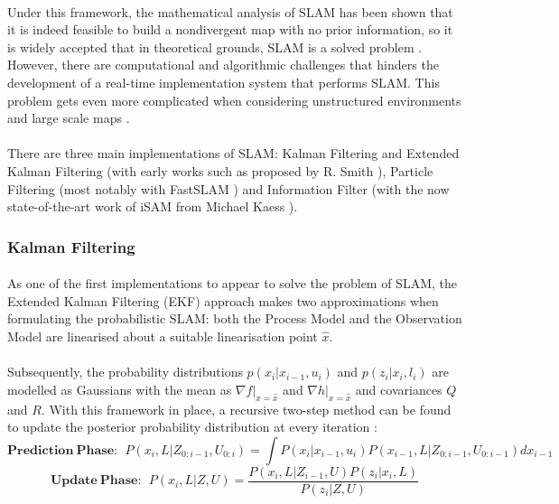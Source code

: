 \documentclass[12pt]{article}
\begin{document}
	\paragraph{}
	Under this framework, the mathematical analysis of SLAM has been shown that it is indeed feasible to build a nondivergent map with no prior information, so it is widely accepted that in theoretical grounds, SLAM is a solved problem \cite{SLAMPartI}\cite{Cadena}\cite{CsorbaThesis}\cite{938381}. However, there are computational and algorithmic challenges that hinders the development of a real-time implementation system that performs SLAM. This problem gets even more complicated when considering unstructured environments and large scale maps \cite{SLAMPartII}.
	
	\paragraph{}
	There are three main implementations of SLAM: Kalman Filtering and Extended Kalman Filtering (with early works such as proposed by R. Smith \cite{Smith:1990:EUS:93002.93291}), Particle Filtering (most notably with FastSLAM \cite{Montemerlo02fastslam:a}) and Information Filter (with the now state-of-the-art work of iSAM from Michael Kaess \cite{Kaess08tro}).

	\subsubsection{Kalman Filtering}
	\paragraph{}
	As one of the first implementations to appear to solve the problem of SLAM, the Extended Kalman Filtering (EKF) approach makes two approximations when formulating the probabilistic SLAM: both the Process Model and the Observation Model are linearised about a suitable linearisation point $\hat{x}$.

	\paragraph{}
	 Subsequently, the probability distributions $p(x_i|x_{i-1}, u_i)$ and $p(z_i|x_i, l_i)$ are modelled as Gaussians with the mean as $\nabla f|_{x=\hat{x}}$ and $\nabla h|_{x=\hat{x}}$ and covariances $Q$ and $R$. With this framework in place, a recursive two-step method can be found to update the posterior probability distribution at every iteration \cite{SLAMPartI}:
		\begin{equation*}
		\mathbf{Prediction\ Phase:}\ \ 
		P(x_{i},L|Z_{0:i-1}, U_{0:i}) = \int P(x_i | x_{i-1}, u_{i}) P(x_{i-1}, L |Z_{0:i-1}, U_{0:i-1})dx_{i-1}
		\end{equation*}
		\begin{equation*}
		\mathbf{Update\ Phase:} \ \  P(x_i, L | Z, U) = \frac{P(x_{i}, L | Z_{i-1}, U)P(z_i|x_i,L)}{P(z_i|Z, U)}
		\end{equation*}	 	
\end{document}
